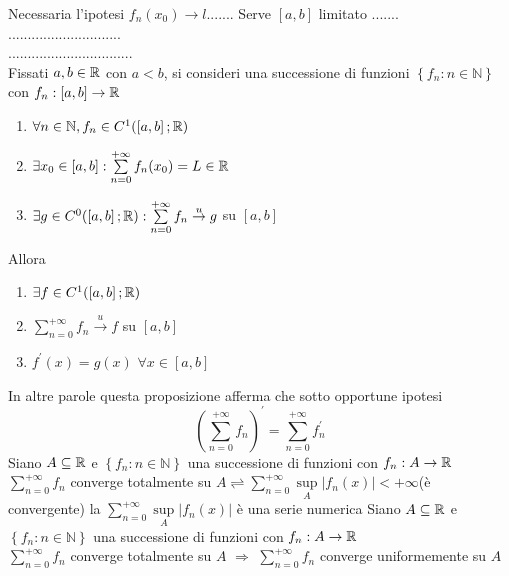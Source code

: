 \observation
Necessaria l'ipotesi $f_n(x_0)\to l$.......
\observation
Serve $\left[a,b\right]$ limitato .......\\
.............................\\
................................\\
\proposition
Fissati $a,b\in \mathbb{R}$ con $a<b$, si consideri una successione di funzioni $\left\{f_n:n\in\mathbb{N}\right\}$ con $f_n:\left[a,b\right]\to \mathbb{R}$
\begin{enumerate}
	\item $\forall n\in\mathbb{N}, f_n\in C^1(\left[a,b\right]; \mathbb{R})$
	\item $\exists x_0\in\left[a,b\right]: \sum\limits_{n=0}^{+\infty}f_n(x_0)=L\in \mathbb{R}$
	\item $\exists g \in C^0(\left[a,b\right]; \mathbb{R}): \sum\limits_{n=0}^{+\infty}f_n\overset{u}{\to}g$ su $\left[a,b\right]$
\end{enumerate}
Allora
\begin{enumerate}
	\item $\exists f\in C^1(\left[a,b\right]; \mathbb{R})$
	\item $\sum\limits_{n=0}^{+\infty}f_n\overset{u}{\to}f$ su $\left[a,b\right]$
	\item $f^{'}(x)=g(x)$ $\forall x\in\left[a,b\right]$
\end{enumerate}
\observation
In altre parole questa proposizione afferma che sotto opportune ipotesi
$$\left(\sum\limits_{n=0}^{+\infty} f_n \right)^{'} =  \sum\limits_{n=0}^{+\infty}f_n^{'}$$
Siano $A\subseteq  \mathbb{R}$ e $\left\{f_n:n\in\mathbb{N}\right\}$ una successione di funzioni con $f_n:A\to \mathbb{R}$\\
$\sum\limits_{n=0}^{+\infty}f_n$ converge totalmente su $A \rightleftharpoons \sum\limits_{n=0}^{+\infty}\sup\limits_{A}\left|f_n(x)\right|<+\infty$(è convergente) 
\observation
la $\sum\limits_{n=0}^{+\infty}\sup\limits_{A}\left|f_n(x)\right|$ è una serie numerica
\proposition
Siano $A\subseteq \mathbb{R}$ e $\left\{f_n:n\in\mathbb{N}\right\}$ una successione di funzioni con $f_n:A\to \mathbb{R}$\\
$\sum\limits_{n=0}^{+\infty}f_n$ converge totalmente su $A$ $\Rightarrow$  $\sum\limits_{n=0}^{+\infty}f_n$ converge uniformemente su $A$
